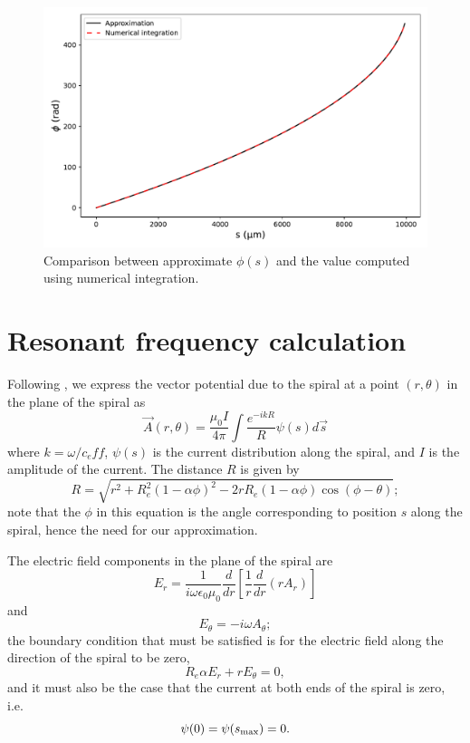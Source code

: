 \documentclass[a4paper, amsfonts, amssymb, amsmath, reprint, showkeys, nofootinbib, twoside]{revtex4-1}
\begin{document}
\begin{figure}
    \centering
    \includegraphics[width=\columnwidth]{phi.pdf}
    \caption{Comparison between approximate $\phi(s)$ and the value computed using numerical integration.}
    \label{fig:phi}
\end{figure}

\section{Resonant frequency calculation}

Following \cite{maleeva_electrodynamics_2014, maleeva_electrodynamics_2015}, we express the vector potential due to the spiral at a point $(r, \theta)$ in the plane of the spiral as
\begin{equation} \label{eq:vec}
    \vec{A}(r, \theta) = \frac {\mu_0 I} {4 \pi} \int \frac {e^{-i k R}} {R} \psi(s) d\vec{s}
\end{equation}
where $k = \omega / c_eff$, $\psi(s)$ is the current distribution along the spiral, and $I$ is the amplitude of the current.
The distance $R$ is given by
\[
    R = \sqrt{r^2 + R_e^2 (1 - \alpha \phi)^2 - 2 r R_e (1 - \alpha \phi) \cos(\phi - \theta)};
\]
note that the $\phi$ in this equation is the angle corresponding to position $s$ along the spiral, hence the need for our approximation.

The electric field components in the plane of the spiral are
\[
    E_r = \frac {1} {i \omega \epsilon_0 \mu_0} \frac {d} {dr} \left [ \frac {1} {r} \frac {d} {dr} (r A_r)  \right ]
\]
and
\[
    E_\theta = -i \omega A_\theta;
\]
the boundary condition that must be satisfied is for the electric field along the direction of the spiral to be zero,
\begin{equation}\label{eq:bc1}
    R_e \alpha E_r + r E_\theta = 0,
\end{equation}
and it must also be the case that the current at both ends of the spiral is zero, i.e.
\begin{equation} \label{eq:bc2}
    \psi(0) = \psi(s_{\rm max}) = 0.
\end{equation}
\end{document}
